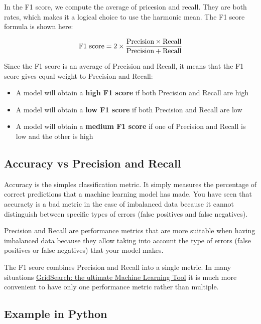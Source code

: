 In the F1 score, we compute the average of pricesion and recall. They
are both rates, which makes it a logical choice to use the harmonic
mean. The F1 score formula is shown here:

\begin{align*}
\textnormal{F1 score} = 2 \times \frac{\textnormal{Precision} \times \textnormal{Recall}}{\textnormal{Precision} + \textnormal{Recall}}
\end{align*}

Since the F1 score is an average of Precision and Recall, it means that
the F1 score gives equal weight to Precision and Recall:

\begin{itemize}
\item
  A model will obtain a \textbf{high F1 score} if both Precision and
  Recall are high
\item
  A model will obtain a \textbf{low F1 score} if both Precision and
  Recall are low
\item
  A model will obtain a \textbf{medium F1 score} if one of Precision and
  Recall is low and the other is high
\end{itemize}

\hypertarget{accuracy-vs-precision-and-recall}{%
\subsection{Accuracy vs Precision and
Recall}\label{accuracy-vs-precision-and-recall}}

Accuracy is the simples classification metric. It simply measures the
percentage of correct predictions that a machine learning model has
made. You have seen that accuracty is a bad metric in the case of
imbalanced data because it cannot distinguish between specific types of
errors (false positives and false negatives).

Precision and Recall are performance metrics that are more suitable when
having imbalanced data because they allow taking into account the type
of errors (false positives or false negatives) that your model makes.

The F1 score combines Precision and Recall into a single metric. In many
situations
\href{https://towardsdatascience.com/gridsearch-the-ultimate-machine-learning-tool-6cd5fb93d07}{GridSearch:
the ultimate Machine Learning Tool} it is much more convenient to have
only one performance metric rather than multiple.

\hypertarget{example-in-python}{%
\subsection{Example in Python}\label{example-in-python}}

